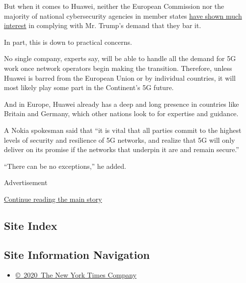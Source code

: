 But when it comes to Huawei, neither the European Commission nor the
majority of national cybersecurity agencies in member states
\href{https://www.nytimes.com/2019/03/17/us/politics/huawei-ban.html}{have
shown much interest} in complying with Mr. Trump's demand that they bar
it.

In part, this is down to practical concerns.

No single company, experts say, will be able to handle all the demand
for 5G work once network operators begin making the transition.
Therefore, unless Huawei is barred from the European Union or by
individual countries, it will most likely play some part in the
Continent's 5G future.

And in Europe, Huawei already has a deep and long presence in countries
like Britain and Germany, which other nations look to for expertise and
guidance.

A Nokia spokesman said that ``it is vital that all parties commit to the
highest levels of security and resilience of 5G networks, and realize
that 5G will only deliver on its promise if the networks that underpin
it are and remain secure.''

``There can be no exceptions,'' he added.

Advertisement

\protect\hyperlink{after-bottom}{Continue reading the main story}

\hypertarget{site-index}{%
\subsection{Site Index}\label{site-index}}

\hypertarget{site-information-navigation}{%
\subsection{Site Information
Navigation}\label{site-information-navigation}}

\begin{itemize}
\tightlist
\item
  \href{https://help.nytimes.com/hc/en-us/articles/115014792127-Copyright-notice}{©~2020~The
  New York Times Company}
\end{itemize}

